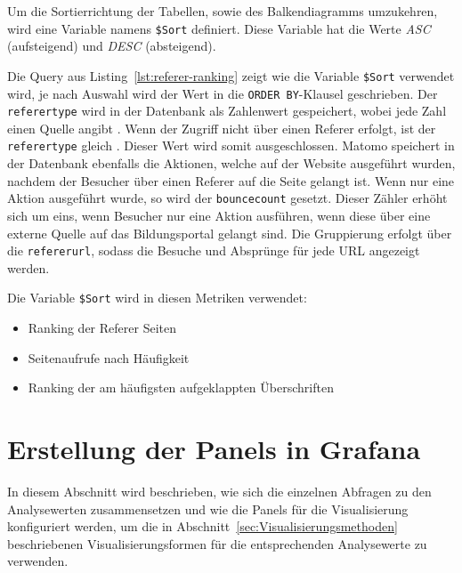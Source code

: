 Um die Sortierrichtung der Tabellen, sowie des Balkendiagramms umzukehren, wird eine Variable namens \texttt{\$Sort} definiert. Diese Variable hat die Werte \textit{ASC} (aufsteigend) und \textit{DESC} (absteigend).

\begin{figure}[H]
    \centering
    \begin{minipage}{\textwidth}
        
    \end{minipage}
\end{figure}

Die Query aus Listing~\ref{lst:referer-ranking} zeigt wie die Variable \texttt{\$Sort} verwendet wird, je nach Auswahl wird der Wert in die {\texttt{ORDER BY}-Klausel} geschrieben. Der \texttt{referer\textunderscore type} wird in der Datenbank als Zahlenwert gespeichert, wobei jede Zahl einen Quelle angibt \parencite{MatomoDBSchema}. Wenn der Zugriff nicht über einen Referer erfolgt, ist der \texttt{referer\textunderscore type} gleich \grqq{}. Dieser Wert wird somit ausgeschlossen. Matomo speichert in der Datenbank ebenfalls die Aktionen, welche auf der Website ausgeführt wurden, nachdem der Besucher über einen Referer auf die Seite gelangt ist. Wenn nur eine Aktion ausgeführt wurde, so wird der \texttt{bounce\textunderscore count} gesetzt. Dieser Zähler erhöht sich um eins, wenn Besucher nur eine Aktion ausführen, wenn diese über eine externe Quelle auf das Bildungsportal gelangt sind. Die Gruppierung erfolgt über die \texttt{referer\textunderscore url}, sodass die Besuche und Absprünge für jede URL angezeigt werden. 

Die Variable \texttt{\$Sort} wird in diesen Metriken verwendet: 
\begin{itemize}
    \item Ranking der Referer Seiten
    \item Seitenaufrufe nach Häufigkeit
    \item Ranking der am häufigsten aufgeklappten Überschriften
\end{itemize}

\section{Erstellung der Panels in Grafana}
In diesem Abschnitt wird beschrieben, wie sich die einzelnen Abfragen zu den Analysewerten zusammensetzen und wie die Panels für die Visualisierung konfiguriert werden, um die in Abschnitt~\ref{sec:Visualisierungsmethoden} beschriebenen Visualisierungsformen für die entsprechenden Analysewerte zu verwenden. 

